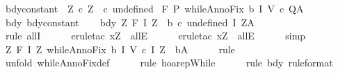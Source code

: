 \begin{isabellebody}
\ bdy{\isacharunderscore}constant{\isacharcolon}\ \ {\isachardoublequoteopen}{\isasymforall}Z{\isachardot}\ c\ Z\ {\isacharequal}\ c\ undefined{\isachardoublequoteclose}\isanewline
{}\ {\isachardoublequoteopen}{\isasymGamma}{\isacharcomma}{\isasymTheta}{\isasymturnstile}\isactrlbsub {\isacharslash}F\isactrlesub \ P\ {\isacharparenleft}whileAnnoFix\ b\ I\ V\ c{\isacharparenright}\ Q{\isacharcomma}A{\isachardoublequoteclose}\isanewline
%
\isadelimproof
%
\endisadelimproof
%
\isatagproof
{}\isamarkupfalse%
\ {\isacharminus}\isanewline
\ \ \isamarkupfalse%
\ bdy\ bdy{\isacharunderscore}constant\isanewline
\ \ \isamarkupfalse%
\ bdy{\isacharprime}{\isacharcolon}\ {\isachardoublequoteopen}{\isasymforall}Z{\isachardot}\ {\isasymGamma}{\isacharcomma}{\isasymTheta}{\isasymturnstile}\isactrlbsub {\isacharslash}F\isactrlesub \ {\isacharparenleft}I\ Z\ {\isasyminter}\ b{\isacharparenright}\ {\isacharparenleft}c\ undefined{\isacharparenright}\ {\isacharparenleft}I\ Z{\isacharparenright}{\isacharcomma}A{\isachardoublequoteclose}\isanewline
\ \ \ \ \isamarkupfalse%
\ {\isacharminus}\ \isanewline
\ \ \ \ \isamarkupfalse%
\ {\isacharparenleft}rule\ allI{\isacharparenright}\isanewline
\ \ \ \ \isamarkupfalse%
\ {\isacharparenleft}erule{\isacharunderscore}tac\ x{\isacharequal}Z\ \ allE{\isacharparenright}\isanewline
\ \ \ \ \isamarkupfalse%
\ {\isacharparenleft}erule{\isacharunderscore}tac\ x{\isacharequal}Z\ \ allE{\isacharparenright}\isanewline
\ \ \ \ \isamarkupfalse%
\ simp\isanewline
\ \ \ \ \isamarkupfalse%
\isanewline
\ \ \isamarkupfalse%
\ {\isachardoublequoteopen}{\isasymforall}Z{\isachardot}\ {\isasymGamma}{\isacharcomma}{\isasymTheta}{\isasymturnstile}\isactrlbsub {\isacharslash}F\isactrlesub \ {\isacharparenleft}I\ Z{\isacharparenright}\ {\isacharparenleft}whileAnnoFix\ b\ I\ V\ c{\isacharparenright}\ {\isacharparenleft}I\ Z\ {\isasyminter}\ {\isacharminus}b{\isacharparenright}{\isacharcomma}A{\isachardoublequoteclose}\isanewline
\ \ \ \ \isamarkupfalse%
\ rule\isanewline
\ \ \ \ \isamarkupfalse%
\ {\isacharparenleft}unfold\ whileAnnoFix{\isacharunderscore}def{\isacharparenright}\isanewline
\ \ \ \ \isamarkupfalse%
\ {\isacharparenleft}rule\ hoarep{\isachardot}While{\isacharparenright}\isanewline
\ \ \ \ \isamarkupfalse%
\ {\isacharparenleft}rule\ bdy{\isacharprime}\ {\isacharbrackleft}rule{\isacharunderscore}format{\isacharbrackright}{\isacharparenright}\isanewline

\end{isabellebody}
